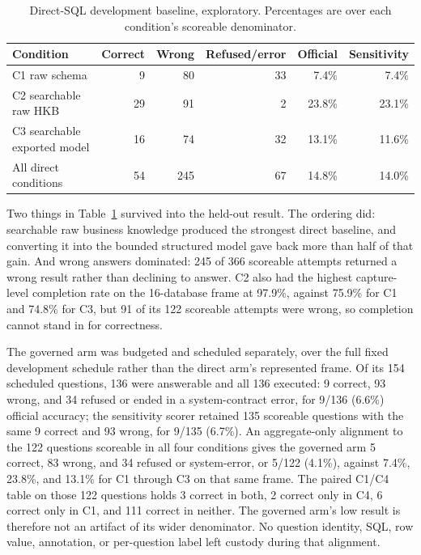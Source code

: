 \begin{table}[htbp]
\centering
\caption{Direct-SQL development baseline, exploratory. Percentages are over each
condition's scoreable denominator.}
\label{tab:devbaseline}
\begin{tabular}{lrrrrr}
\toprule
Condition & Correct & Wrong & Refused/error & Official & Sensitivity \\
\midrule
C1 raw schema & 9 & 80 & 33 & 7.4\% & 7.4\% \\
C2 searchable raw HKB & 29 & 91 & 2 & 23.8\% & 23.1\% \\
C3 searchable exported model & 16 & 74 & 32 & 13.1\% & 11.6\% \\
\midrule
All direct conditions & 54 & 245 & 67 & 14.8\% & 14.0\% \\
\bottomrule
\end{tabular}
\end{table}

Two things in Table~\ref{tab:devbaseline} survived into the held-out result. The
ordering did: searchable raw business knowledge produced the strongest direct
baseline, and converting it into the bounded structured model gave back more than
half of that gain. And wrong answers dominated: 245 of 366 scoreable attempts
returned a wrong result rather than declining to answer. C2 also had the highest
capture-level completion rate on the 16-database frame at 97.9\%, against 75.9\%
for C1 and 74.8\% for C3, but 91 of its 122 scoreable attempts were wrong, so
completion cannot stand in for correctness.

The governed arm was budgeted and scheduled separately, over the full fixed
development schedule rather than the direct arm's represented frame. Of its 154
scheduled questions, 136 were answerable and all 136 executed: 9 correct, 93
wrong, and 34 refused or ended in a system-contract error, for 9/136 (6.6\%)
official accuracy; the sensitivity scorer retained 135 scoreable questions with
the same 9 correct and 93 wrong, for 9/135 (6.7\%). An aggregate-only alignment
to the 122 questions scoreable in all four conditions gives the governed arm 5
correct, 83 wrong, and 34 refused or system-error, or 5/122 (4.1\%), against
7.4\%, 23.8\%, and 13.1\% for C1 through C3 on that same frame. The paired
C1/C4 table on those 122 questions holds 3 correct in both, 2 correct only in C4,
6 correct only in C1, and 111 correct in neither. The governed arm's low result
is therefore not an artifact of its wider denominator. No question identity, SQL,
row value, annotation, or per-question label left custody during that alignment.

